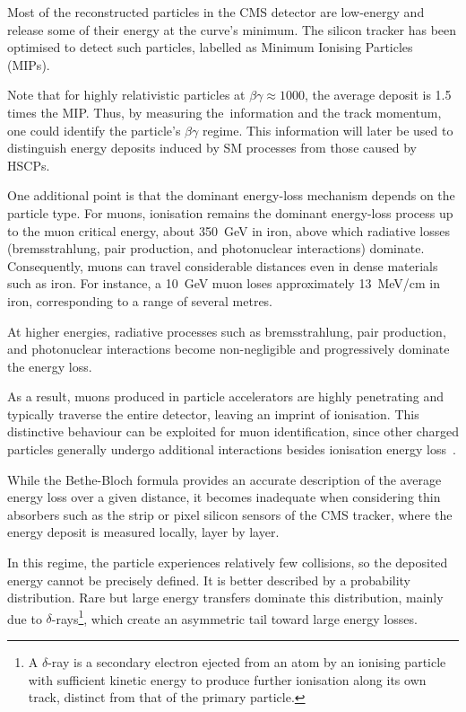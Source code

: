 \vspace{0.5 cm}

Most of the reconstructed particles in the CMS detector are low-energy and release some of their energy at the curve's minimum. The silicon tracker has been optimised to detect such particles, labelled as Minimum Ionising Particles (MIPs).

Note that for highly relativistic particles at $\beta\gamma\approx1000$, the average deposit is 1.5 times the MIP. Thus, by measuring the \dedx\,information and the track momentum, one could identify the particle's $\beta\gamma$ regime. This information will later be used to distinguish energy deposits induced by SM processes from those caused by HSCPs.

\vspace{0.5 cm}

One additional point is that the dominant energy-loss mechanism depends on the particle type. For muons, ionisation remains the dominant energy-loss process up to the muon critical energy, about 350~GeV in iron, above which radiative losses (bremsstrahlung, pair production, and photonuclear interactions) dominate. Consequently, muons can travel considerable distances even in dense materials such as iron. For instance, a 10~GeV muon loses approximately 13~MeV/cm in iron, corresponding to a range of several metres. 

At higher energies, radiative processes such as bremsstrahlung, pair production, and photonuclear interactions become non-negligible and progressively dominate the energy loss. 

As a result, muons produced in particle accelerators are highly penetrating and typically traverse the entire detector, leaving an imprint of ionisation. This distinctive behaviour can be exploited for muon identification, since other charged particles generally undergo additional interactions besides ionisation energy loss~\cite{Thomson_2013}.


\vspace{0.5 cm}

While the Bethe-Bloch formula provides an accurate description of the average energy loss over a given distance, it becomes inadequate when considering thin absorbers such as the strip or pixel silicon sensors of the CMS tracker, where the energy deposit is measured locally, layer by layer.

In this regime, the particle experiences relatively few collisions, so the deposited energy cannot be precisely defined. It is better described by a probability distribution. Rare but large energy transfers dominate this distribution, mainly due to $\delta$-rays\footnote{A $\delta$-ray is a secondary electron ejected from an atom by an ionising particle with sufficient kinetic energy to produce further ionisation along its own track, distinct from that of the primary particle.}, which create an asymmetric tail toward large energy losses.

